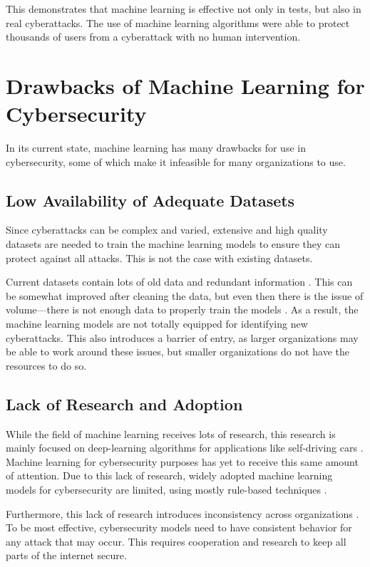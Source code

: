 This demonstrates that machine learning is effective not only in tests, but also in real cyberattacks.
The use of machine learning algorithms were able to protect thousands of users from a cyberattack with no human intervention.

\section{Drawbacks of Machine Learning for Cybersecurity}
In its current state, machine learning has many drawbacks for use in cybersecurity, some of which make it infeasible for many organizations to use.

\subsection{Low Availability of Adequate Datasets}
Since cyberattacks can be complex and varied, extensive and high quality datasets are needed to train the machine learning models to ensure they can protect against all attacks.
This is not the case with existing datasets.

Current datasets contain lots of old data and redundant information \cite{xin2018}.
This can be somewhat improved after cleaning the data, but even then there is the issue of volume---there is not enough data to properly train the models \cite{xin2018}.
As a result, the machine learning models are not totally equipped for identifying new cyberattacks.
This also introduces a barrier of entry, as larger organizations may be able to work around these issues, but smaller organizations do not have the resources to do so.

\subsection{Lack of Research and Adoption}
While the field of machine learning receives lots of research, this research is mainly focused on deep-learning algorithms for applications like self-driving cars \cite{grandchallenge2019}.
Machine learning for cybersecurity purposes has yet to receive this same amount of attention.
Due to this lack of research, widely adopted machine learning models for cybersecurity are limited, using mostly rule-based techniques \cite{grandchallenge2019}.

Furthermore, this lack of research introduces inconsistency across organizations \cite{grandchallenge2019}.
To be most effective, cybersecurity models need to have consistent behavior for any attack that may occur.
This requires cooperation and research to keep all parts of the internet secure.

